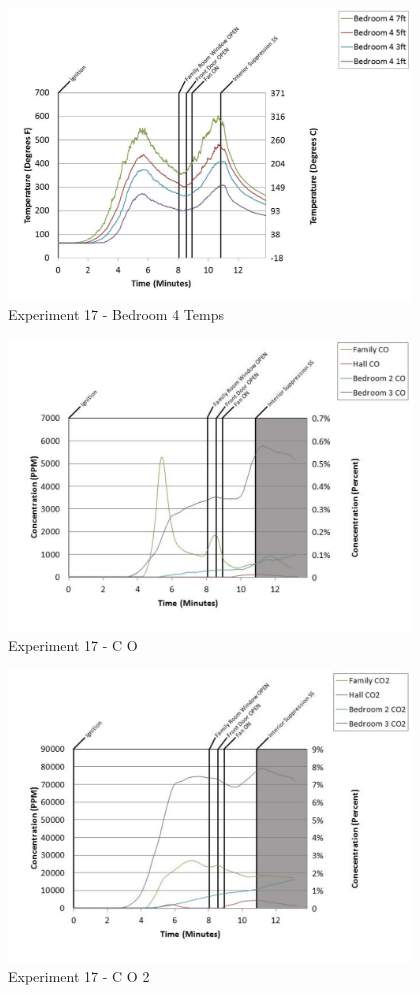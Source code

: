 \documentclass{article}
\begin{document}
\begin{appendices}
	\begin{figure}[h!]
		\centering
		\includegraphics[height=3.05in]{0_Images/Results_Charts/Exp_17_Charts/Bedroom4Temps.pdf}
		\caption{Experiment 17 - Bedroom 4 Temps}
	\end{figure}
 
	\clearpage

	\begin{figure}[h!]
		\centering
		\includegraphics[height=3.05in]{0_Images/Results_Charts/Exp_17_Charts/CO.pdf}
		\caption{Experiment 17 - C O}
	\end{figure}
 

	\begin{figure}[h!]
		\centering
		\includegraphics[height=3.05in]{0_Images/Results_Charts/Exp_17_Charts/CO2.pdf}
		\caption{Experiment 17 - C O 2}
	\end{figure}
 

\end{appendices}
\end{document}

